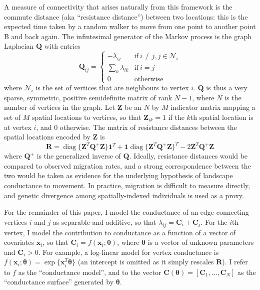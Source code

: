 \documentclass[11pt]{article}
\DeclareMathOperator*{\diag}{diag}
\newcommand{\mat}[1]{\mathbf{#1}}
\begin{document}
A measure of connectivity that arises naturally from this framework is the
commute distance (aka ``resistance distance'') between two locations: this is
the expected time taken by a random walker to move from one point to another
point B and back again. The infintesimal generator of the Markov process is the
graph Laplacian $\mat Q$ with entries
\[
  \mat Q_{ij} = \begin{cases} 
    -\lambda_{ij} & \mathrm{if~} i \neq j, j \in \mathcal{N}_i \\ 
    \sum_k \lambda_{ik} & \mathrm{if~} i = j \\
    0 & \mathrm{otherwise}
  \end{cases}
\]
where $\mathcal{N}_i$ is the set of vertices that are neighbours to vertex $i$.
$\mat Q$ is thus a very sparse, symmetric, positive semidefinite matrix of rank
$N-1$, where $N$ is the number of vertices in the graph. Let $\mat Z$ be an $N$
by $M$ indicator matrix mapping a set of $M$ spatial locations to vertices,
so that $\mat Z_{ik} = 1$ if the $k$th spatial location is at vertex
$i$, and $0$ otherwise. The matrix of resistance distances between the spatial
locations encoded by $\mat Z$ is
\begin{equation}
  \label{resistance}
  \mat R = \diag \{ \mat Z^T \mat Q^+ \mat Z \} \mat 1^T + 
           \mat 1 \diag \{\mat Z^T \mat Q^+ \mat Z \}^T - 
           2 \mat Z^T \mat Q^+ \mat Z
\end{equation}
where $\mat Q^+$ is the generalized inverse of $\mat Q$. Ideally, resistance
distances would be compared to observed migration rates, and a strong
correspondence between the two would be taken as evidence for the underlying
hypothesis of landscape conductance to movement. In practice, migration is
difficult to measure directly, and genetic divergence among spatially-indexed
individuals is used as a proxy.

For the remainder of this paper, I model the conductance of an edge connecting
vertices $i$ and $j$ as separable and additive, so that $\lambda_{ij} = \mat
C_i + \mat C_j$. For the $i$th vertex, I model the contribution to conductance
as a function of a vector of covariates $\mat x_i$, so that $\mat C_i = f(\mat
x_i; \bm \theta)$, where $\bm \theta$ is a vector of unknown parameters and
$\mat C_i > 0$.  For example, a log-linear model for vertex conductance is
$f(\mat x_i; \bm \theta) = \exp\{\mat x_i^T \bm \theta\}$ (an intercept is
omitted as it simply rescales $\mat R$). I refer to $f$ as the ``conductance
model'', and to the vector $\mat C(\bm \theta) = [\mat C_1, \dots, \mat C_N]$
as the ``conductance surface'' generated by $\bm \theta$.
\end{document}
